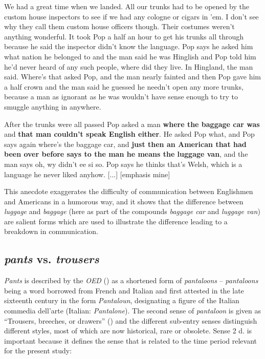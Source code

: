 \begin{ipquote}
\begin{center}
\end{center}

We had a great time when we landed. All our trunks had to be opened by the custom house inspectors to see if we had any cologne or cigars in ’em. I don’t see why they call them custom house officers though. Their costumes weren’t anything wonderful. It took Pop a half an hour to get his trunks all through because he said the inspector didn't know the language. Pop says he asked him what nation he belonged to and the man said he was Hinglish and Pop told him he'd never heard of any such people, where did they live. In Hingland, the man said. Where's that asked Pop, and the man nearly fainted and then Pop gave him a half crown and the man said he guessed he needn't open any more trunks, because a man as ignorant as he was wouldn't have sense enough to try to smuggle anything in anywhere.

After the trunks were all passed Pop asked a man \textbf{where the baggage car was} and \textbf{that man couldn't speak English either}. He asked Pop what, and Pop says again where's the baggage car, and \textbf{just then an American that had been over before says to the man he means the luggage van}, and the man says oh, wy didn't ee si so. Pop says he thinks that's Welsh, which is a language he never liked anyhow.
[...] [emphasis mine]
\end{ipquote}


This anecdote exaggerates the difficulty of communication between Englishmen and Americans in a humorous way, and it shows that the difference between \emph{luggage} and \emph{baggage} (here as part of the compounds \emph{baggage car} and \emph{luggage van}) are salient forms which are used to illustrate the difference leading to a breakdown in communication.


\subsection{\textit{pants} vs. \textit{trousers}}
\label{bkm:Ref528933812}\hypertarget{Toc63021230}{}
\emph{Pants} is described by the \emph{OED} (\citeyear{pants}) as a shortened form of \emph{pantaloons} – \emph{pantaloons} being a word borrowed from French and Italian and first attested in the late sixteenth century in the form \emph{Pantaloun}, designating a figure of the Italian commedia dell’arte (Italian: \emph{Pantalone}). The second sense of \textit{pantaloon} is given as “Trousers, breeches, or drawers” (\citeyear{pantaloon}) and the different sub-entry senses distinguish different styles, most of which are now historical, rare or obsolete. Sense 2 d. is important because it defines the sense that is related to the time period relevant for the present study:


